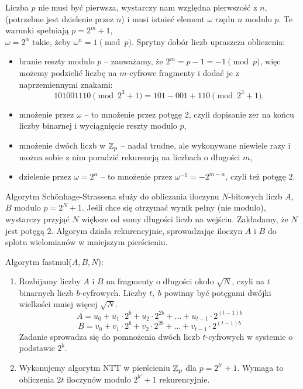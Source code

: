 Liczba \( p \) nie musi być pierwsza, wystarczy nam względna pierwszość z \( n \), (potrzebne jest dzielenie przez \( n \)) i musi istnieć element \( \omega \) rzędu \( n \) modulo \( p \).
Te warunki spełniają \( p = 2^m + 1 \), \\ \( \omega = 2^{\alpha} \) takie, żeby \( \omega^n = 1 \pmod{p} \). Sprytny dobór liczb upraszcza obliczenia:
\begin{itemize}
    \item branie reszty modulo \( p \) -- zauważamy, że \( 2^m = p - 1 = -1 \pmod{p} \), więc możemy podzielić liczbę na \( m \)-cyfrowe fragmenty i dodać je z naprzemiennymi znakami:
    \[
        101001110 \pmod{2^3 + 1} = 101 - 001 + 110 \pmod{2^3 + 1},
    \]
    \item mnożenie przez \( \omega \) -- to mnożenie przez potęgę 2, czyli dopisanie zer na końcu liczby binarnej i wyciągnięcie reszty modulo \( p \),
    \item mnożenie dwóch liczb w \( \mathbb{Z}_p \) -- nadal trudne, ale wykonywane niewiele razy i można sobie z nim poradzić rekurencją na liczbach o długości \( m \),
    \item dzielenie przez \( \omega = 2^{\alpha} \) -- to mnożenie przez \( \omega^{-1} = -2^{m-\alpha} \), czyli też potęgę 2.
\end{itemize}

Algorytm Sch{\"o}nhage-Strassena służy do obliczania iloczynu \( N \)-bitowych liczb \( A \), \( B \) modulo \( p = 2^N + 1 \).
Jeśli chce się otrzymać wynik pełny (nie modulo), wystarczy przyjąć \( N \) większe od sumy długości liczb na wejściu. Zakładamy, że \( N \) jest potęgą 2. Algorym działa rekurencyjnie, sprowadzając iloczyn \( A \) i \( B \) do splotu wielomianów w mniejszym pierścieniu.

\begin{greyframe}
    Algorytm fastmul(\( A, B, N \)):
    \begin{enumerate}
        \item Rozbijamy liczby \( A \) i \( B \) na fragmenty o długości około \( \sqrt{N} \), czyli na \( t \) binarnych liczb \( b \)-cyfrowych. Liczby \( t, \ b \) powinny być potęgami dwójki wielkości mniej więcej \( \sqrt{N} \).
        \[
            A = u_0 + u_1 \cdot 2^b + u_2 \cdot 2^{2b} + \ldots + u_{t-1} \cdot  2^{(t-1)b}
        \]
        \[
            B = v_0 + v_1 \cdot 2^b + v_2 \cdot 2^{2b} + \ldots + v_{t-1} \cdot 2^{(t-1)b}
        \]
        Zadanie sprowadza się do pomnożenia dwóch liczb \( t \)-cyfrowych w systemie o podstawie \( 2^b \).

        \item Wykonujemy algorytm NTT w pierścieniu \( \mathbb{Z}_p \) dla \( p = 2^{b'} + 1 \). Wymaga to obliczenia \( 2t \) iloczynów modulo \( 2^{b'} + 1 \) rekurencyjnie.
    \end{enumerate}
\end{greyframe}

